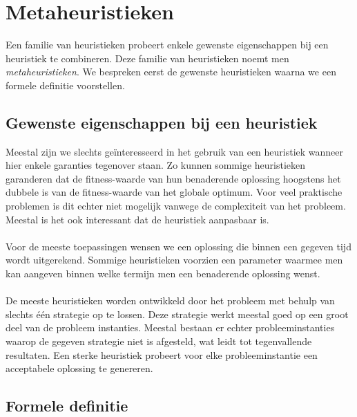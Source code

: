 \section{Metaheuristieken}

Een familie van heuristieken probeert enkele gewenste eigenschappen bij een heuristiek te combineren. Deze familie van heuristieken noemt men \emph{metaheuristieken}\cite{journals/cor/Glover86}. We bespreken eerst de gewenste heuristieken waarna we een formele definitie voorstellen.

\subsection{Gewenste eigenschappen bij een heuristiek}

Meestal zijn we slechts ge\"interesseerd in het gebruik van een heuristiek wanneer hier enkele garanties tegenover staan. Zo kunnen sommige heuristieken garanderen dat de fitness-waarde van hun benaderende oplossing hoogstens het dubbele is van de fitness-waarde van het globale optimum. Voor veel praktische problemen is dit echter niet mogelijk vanwege de complexiteit van het probleem. Meestal is het ook interessant dat de heuristiek aanpasbaar is.

\paragraph{}
Voor de meeste toepassingen wensen we een oplossing die binnen een gegeven tijd wordt uitgerekend. Sommige heuristieken voorzien een parameter waarmee men kan aangeven binnen welke termijn men een benaderende oplossing wenst.

\paragraph{}
De meeste heuristieken worden ontwikkeld door het probleem met behulp van slechts \'e\'en strategie op te lossen. Deze strategie werkt meestal goed op een groot deel van de probleem instanties. Meestal bestaan er echter probleeminstanties waarop de gegeven strategie niet is afgesteld, wat leidt tot tegenvallende resultaten. Een sterke heuristiek probeert voor elke probleeminstantie een acceptabele oplossing te genereren.

\subsection{Formele definitie}

